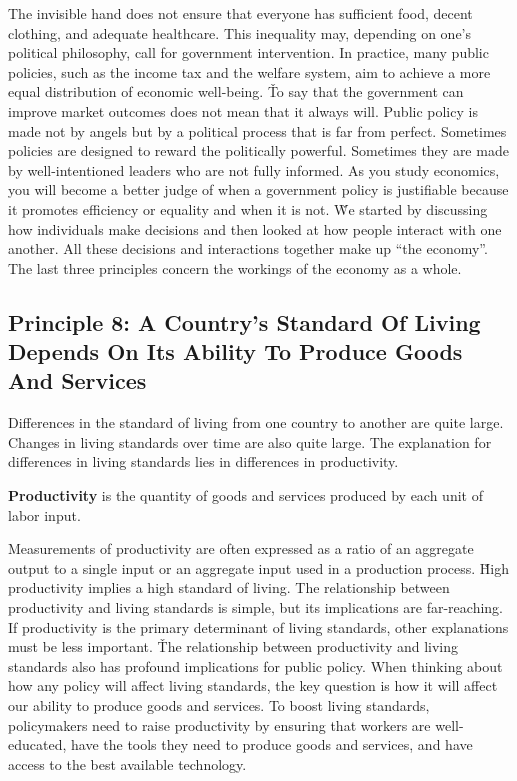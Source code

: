The invisible hand does not ensure that everyone has sufficient food, decent clothing, and adequate healthcare. This
inequality may, depending on one's political philosophy, call for government intervention. In practice, many public
policies, such as the income tax and the welfare system, aim to achieve a more equal distribution of economic
well-being. \v

To say that the government can improve market outcomes does not mean that it always will. Public policy is made not
by angels but by a political process that is far from perfect. Sometimes policies are designed to reward the
politically powerful. Sometimes they are made by well-intentioned leaders who are not fully informed. As you study
economics, you will become a better judge of when a government policy is justifiable because it promotes efficiency
or equality and when it is not. \v

We started by discussing how individuals make decisions and then looked at how people interact with one another. All
these decisions and interactions together make up ``the economy''. The last three principles concern the workings of
the economy as a whole.

\subsection*{Principle 8: A Country's Standard Of Living Depends On Its Ability To Produce Goods And Services}

Differences in the standard of living from one country to another are quite large. Changes in living standards over
time are also quite large. The explanation for differences in living standards lies in differences in productivity.

\bd[Productivity]
\textbf{Productivity} is the quantity of goods and services produced by each unit of labor input.
\ed

Measurements of productivity are often expressed as a ratio of an aggregate output to a single input or an aggregate
input used in a production process. \v

High productivity implies a high standard of living. The relationship between productivity and living standards is
simple, but its implications are far-reaching. If productivity is the primary determinant of living standards, other
explanations must be less important. \v

The relationship between productivity and living standards also has profound implications for public policy. When
thinking about how any policy will affect living standards, the key question is how it will affect our ability to
produce goods and services. To boost living standards, policymakers need to raise productivity by ensuring that
workers are well-educated, have the tools they need to produce goods and services, and have access to the best
available technology.

